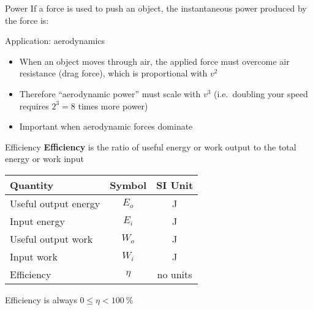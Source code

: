 \documentclass[12pt,compress,aspectratio=169]{beamer}
\begin{document}
\begin{frame}{Power}
  If a force is used to push an object, the instantaneous power produced by the
  force is:
  
  
  Application: aerodynamics
  \begin{itemize}
  \item When an object moves through air, the applied force must overcome air
    resistance (drag force), which is proportional with $v^2$
    \item Therefore ``aerodynamic power'' must scale with $v^3$ (i.e.\ doubling
      your speed requires $2^3=8$ times more power)
    \item Important when aerodynamic forces dominate
  \end{itemize}
\end{frame}



\begin{frame}{Efficiency}
  \textbf{Efficiency} is the ratio of useful energy or work output to the total
  energy or work input

  \begin{center}
    \begin{tabular}{l|c|c}
      \rowcolor{pink}
      \textbf{Quantity} & \textbf{Symbol} & \textbf{SI Unit} \\ \hline
      Useful output energy & $E_o$  & \si\joule \\
      Input energy         & $E_i$  & \si\joule \\
      Useful output work   & $W_o$  & \si\joule \\
      Input work           & $W_i$  & \si\joule \\
      Efficiency           & $\eta$ & no units
    \end{tabular}
  \end{center}
  Efficiency is always $0\leq\eta<\SI{100}\percent$
\end{frame}
\end{document}
